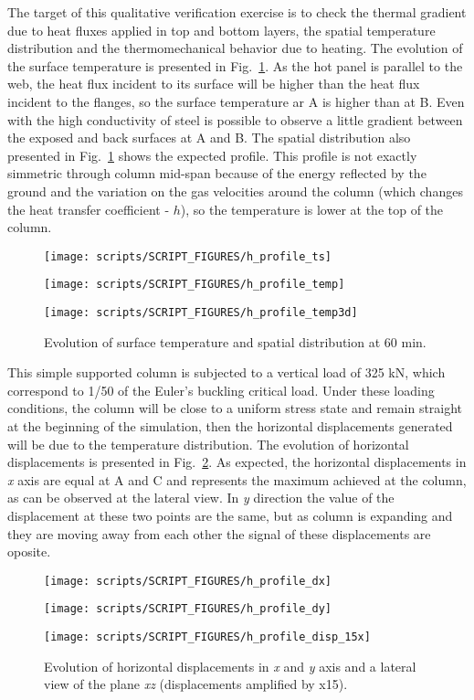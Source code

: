 \documentclass[11pt]{book}
\begin{document}
The target of this qualitative verification exercise is to check the thermal gradient due to heat fluxes applied in top and bottom layers, the spatial temperature distribution and the thermomechanical behavior due to heating. The evolution of the surface temperature is presented in Fig.~\ref{h_profile1}. As the hot panel is parallel to the web, the heat flux incident to its surface will be higher than the heat flux incident to the flanges, so the surface temperature ar A is higher than at B. Even with the high conductivity of steel is possible to observe a little gradient between the exposed and back surfaces at A and B. The spatial distribution also presented in Fig.~\ref{h_profile1} shows the expected profile. This profile is not exactly simmetric through column mid-span because of the energy reflected by the ground and the variation on the gas velocities around the column (which changes the heat transfer coefficient - $h$), so the temperature is lower at the top of the column.

\begin{figure}[ht]
\noindent
\parbox[c]{22em}{\texttt{[image: scripts/SCRIPT\_FIGURES/h\_profile\_ts]}} 
\parbox[c]{11em}{\texttt{[image: scripts/SCRIPT\_FIGURES/h\_profile\_temp]}} 
\parbox[c]{1em}{\texttt{[image: scripts/SCRIPT\_FIGURES/h\_profile\_temp3d]}} 
\caption[The  results]{Evolution of surface temperature and spatial distribution at 60 min.}
\label{h_profile1}
\end{figure}

This simple supported column is subjected to a vertical load of 325 kN, which correspond to 1/50 of the Euler's buckling critical load. Under these loading conditions, the column will be close to a uniform stress state and remain straight at the beginning of the simulation, then the horizontal displacements generated will be due to the temperature distribution. The evolution of horizontal displacements is presented in Fig.~\ref{h_profile2}. As expected, the horizontal displacements in \textit{x} axis are equal at A and C and represents the maximum achieved at the column, as can be observed at the lateral view. In \textit{y} direction the value of the displacement at these two points are the same, but as column is expanding and they are moving away from each other the signal of these displacements are oposite.

\begin{figure}[ht]
\noindent
\parbox[c]{19em}{\texttt{[image: scripts/SCRIPT\_FIGURES/h\_profile\_dx]}} 
\parbox[c]{17.5em}{\texttt{[image: scripts/SCRIPT\_FIGURES/h\_profile\_dy]}}
\parbox[c]{1em}{\texttt{[image: scripts/SCRIPT\_FIGURES/h\_profile\_disp\_15x]}} 
\caption[The  results]{Evolution of horizontal displacements in \textit{x} and \textit{y} axis and a lateral view of the plane \textit{xz} (displacements amplified by x15).}
\label{h_profile2}
\end{figure}
\end{document}
